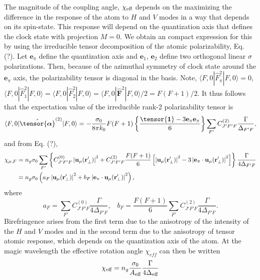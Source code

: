 \documentclass[preprint,aps,pra,onecolumn]{revtex4-1} %
\begin{document}
The magnitude of the coupling angle, $\chi_{\text{eff}}$ depends on the maximizing the difference in the response of the atom to $H$ and $V$ modes in a way that depends on its spin-state.  This response will depend on the quantization axis that defines the clock state with projection $M=0$.  We obtain an compact expression for this by using the irreducible tensor decomposition of the atomic polarizability, Eq. (?).  Let $\mathbf{e}_\pi$ define the quantization axis and $\mathbf{e}_{1}$, $\mathbf{e}_{2}$ define two orthogonal linear $\sigma$ polarizations.  Then, because of the azimuthal symmetry of clock state around the $\mathbf{e}_\pi$ axis, the polarizability tensor is diagonal in the basis.  Note, $\langle F,0 | \hat{F}_{\pi}^2| F,0 \rangle =0$, $\langle F,0 | \hat{F}_{1}^2| F,0 \rangle = \langle F,0 | \hat{F}_{2}^2| F,0 \rangle = \langle F,0 | \hat{\mathbf{F}}^2| F,0 \rangle /2 =F(F+1)/2$.  It thus follows that the expectation value of the  irreducible rank-2 polarizability tensor is
\begin{equation}
\langle F,0 | \hat{\tensor{\boldsymbol{\alpha}}}^{(2)}| F,0 \rangle  = -\frac{\sigma_0}{8\pi k_0} F(F+1) \left\{ \frac{\tensor{\boldsymbol{1}} - 3 \mathbf{e}_\pi \mathbf{e}_\pi }{6} \right\} \sum_{F'} C^{(2)}_{J'F'F} \frac{\Gamma}{ \Delta_{F'F}},
\end{equation}
and from Eq. (?),
\begin{align}
\chi_{\mu,F} &= n_g \sigma_0 \sum_{F'}  \left\{C^{(0)}_{J'F'F}\left|\mathbf{u}_\mu(\mathbf{r}'_\perp)\right|^2+ C^{(2)}_{J'F'F} \frac{F(F+1)}{6}\left[\left|\mathbf{u}_\mu(\mathbf{r}'_\perp)\right|^2- 3 \left|\mathbf{e}_\pi \cdot \mathbf{u}_\mu(\mathbf{r}'_\perp)\right|^2 \right]\right\}   \frac{\Gamma}{4 \Delta_{F'F}} \nonumber \\
&  = n_g \sigma_0\left(  a_{F} \left|\mathbf{u}_\mu(\mathbf{r}'_\perp)\right|^2 + b_{F} \left|\mathbf{e}_\pi \cdot \mathbf{u}_\mu(\mathbf{r}'_\perp)\right|^2 \right),
\end{align}
where
\begin{equation}
a_F = \sum_{F'}  C^{(0)}_{J'F'F} \frac{\Gamma}{4 \Delta_{F'F}},\; \;\; b_F = \frac{F(F+1)}{6}\sum_{F'} C^{(2)}_{J'F'F}  \frac{\Gamma}{4 \Delta_{F'F}}.
\end{equation}
Birefringence arises from the first term due to the anisotropy of the intensity of the $H$ and $V$ modes and in the second term due to the anisotropy of tensor atomic response, which depends on the quantization axis of the atom.  At the magic wavelength the effective rotation angle $\chi_{eff}$ can then be written
\begin{equation}
\chi_{\text{eff}} = n_g\frac{\sigma_0}{A_{\text{eff}}} \frac{\Gamma}{4\Delta_{\text{eff}}}
\end{equation}
\end{document}
